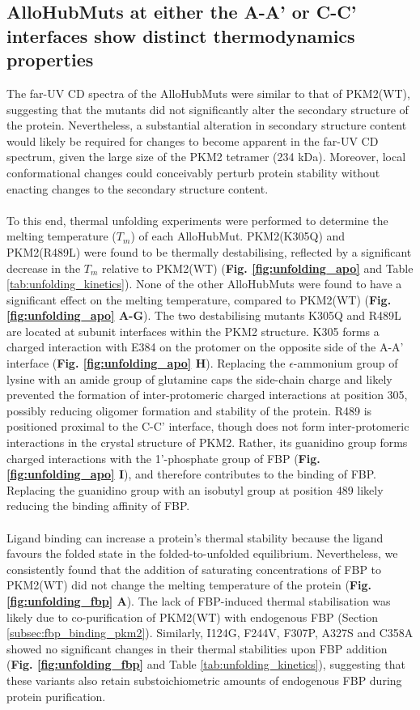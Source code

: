 \subsection{AlloHubMuts at either the A-A' or C-C' interfaces show distinct thermodynamics properties}
The far-UV CD spectra of the AlloHubMuts were similar to that of PKM2(WT), suggesting that the mutants did not significantly alter the secondary structure of the protein. Nevertheless, a substantial alteration in secondary structure content would likely be required for changes to become apparent in the far-UV CD spectrum, given the large size of the PKM2 tetramer (234 kDa). Moreover, local conformational changes could conceivably perturb protein stability without enacting changes to the secondary structure content. 
%
%
\\\\
%
%
To this end, thermal unfolding experiments were performed to determine the melting temperature ($T_m$) of each AlloHubMut. PKM2(K305Q) and PKM2(R489L) were found to be thermally destabilising, reflected by a significant decrease in the $T_m$ relative to PKM2(WT) (\textbf{Fig. \ref{fig:unfolding_apo}} and Table \ref{tab:unfolding_kinetics}). None of the other AlloHubMuts were found to have a significant effect on the melting temperature, compared to PKM2(WT) (\textbf{Fig. \ref{fig:unfolding_apo} A-G}). The two destabilising mutants K305Q and R489L are located at subunit interfaces within the PKM2 structure. K305 forms a charged interaction with E384 on the protomer on the opposite side of the A-A' interface (\textbf{Fig. \ref{fig:unfolding_apo} H}). Replacing the $\epsilon$-ammonium group of lysine with an amide group of glutamine caps the side-chain charge and likely prevented the formation of inter-protomeric charged interactions at position 305, possibly reducing oligomer formation and stability of the protein. R489 is positioned proximal to the C-C' interface, though does not form inter-protomeric interactions in the crystal structure of PKM2. Rather, its guanidino group forms charged interactions with the 1'-phosphate group of FBP (\textbf{Fig. \ref{fig:unfolding_apo} I}), and therefore contributes to the binding of FBP. Replacing the guanidino group with an isobutyl group at position 489 likely reducing the binding affinity of FBP.
%
%
\\\\
%
%
Ligand binding can increase a protein's thermal stability because the ligand favours the folded state in the folded-to-unfolded equilibrium. Nevertheless, we consistently found that the addition of saturating concentrations of FBP to PKM2(WT) did not change the melting temperature of the protein (\textbf{Fig. \ref{fig:unfolding_fbp} A}). The lack of FBP-induced thermal stabilisation was likely due to co-purification of PKM2(WT) with endogenous FBP (Section \ref{subsec:fbp_binding_pkm2}). Similarly, I124G, F244V, F307P, A327S and C358A showed no significant changes in their thermal stabilities upon FBP addition (\textbf{Fig. \ref{fig:unfolding_fbp}} and Table \ref{tab:unfolding_kinetics}), suggesting that these variants also retain substoichiometric amounts of endogenous FBP during protein purification.
